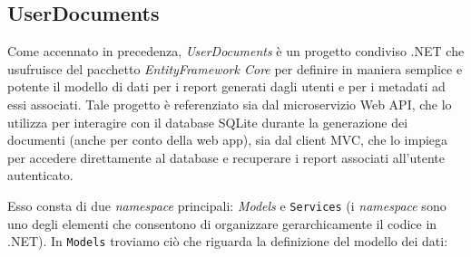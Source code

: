 \subsection{UserDocuments}
Come accennato in precedenza, \emph{UserDocuments} è un progetto condiviso .NET che usufruisce del pacchetto \emph{EntityFramework Core} per definire in maniera semplice e potente il modello di dati per i report generati dagli utenti e per i metadati ad essi associati. Tale progetto è referenziato sia dal microservizio Web API, che lo utilizza per interagire con il database SQLite durante la generazione dei documenti (anche per conto della web app), sia dal client MVC, che lo impiega per accedere direttamente al database e recuperare i report associati all'utente autenticato.

Esso consta di due \emph{namespace} principali: \emph{Models} e \texttt{Services} (i \emph{namespace} sono uno degli elementi che consentono di organizzare gerarchicamente il codice in .NET).
In \texttt{Models} troviamo ciò che riguarda la definizione del modello dei dati:
